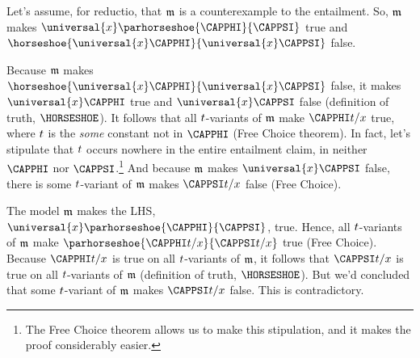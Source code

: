 \begin{PROOF}
	Let's assume, for reductio, that $\mathfrak{m}$ is a counterexample to the entailment.  So, $\mathfrak{m}$ makes $\universal{\variable{x}}\parhorseshoe{\CAPPHI}{\CAPPSI}$ true and $\horseshoe{\universal{\variable{x}}\CAPPHI}{\universal{\variable{x}}\CAPPSI}$ false.
	
	Because $\mathfrak{m}$ makes $\horseshoe{\universal{\variable{x}}\CAPPHI}{\universal{\variable{x}}\CAPPSI}$ false, it makes $\universal{\variable{x}}\CAPPHI$ true and $\universal{\variable{x}}\CAPPSI$ false (definition of truth, $\HORSESHOE$). 
	It follows that all $t$-variants of $\mathfrak{m}$ make $\CAPPHI\variable{t}/\variable{x}$ true, where $t$ is the \emph{some} constant not in $\CAPPHI$ (Free Choice theorem).  In fact, let's stipulate that $t$ occurs nowhere in the entire entailment claim, in neither $\CAPPHI$ nor $\CAPPSI$.\footnote{The Free Choice theorem allows us to make this stipulation, and it makes the proof considerably easier.} 
	 And because $\mathfrak{m}$ makes $\universal{\variable{x}}\CAPPSI$ false, there is some $t$-variant of $\mathfrak{m}$ makes $\CAPPSI\variable{t}/\variable{x}$ false (Free Choice).%

	The model $\mathfrak{m}$ makes the LHS, $\universal{\variable{x}}\parhorseshoe{\CAPPHI}{\CAPPSI}$, true.  
	Hence, all $t$-variants of $\mathfrak{m}$ make $\parhorseshoe{\CAPPHI\variable{t}/\variable{x}}{\CAPPSI\variable{t}/\variable{x}}$ true (Free Choice). %
	 Because $\CAPPHI\variable{t}/\variable{x}$ is true on all $t$-variants of $\mathfrak{m}$, it follows that $\CAPPSI\variable{t}/\variable{x}$ is true on all $t$-variants of $\mathfrak{m}$ (definition of truth, $\HORSESHOE$).  But we'd concluded that some $t$-variant of $\mathfrak{m}$ makes $\CAPPSI\variable{t}/\variable{x}$ false.  This is contradictory.
	 

\end{PROOF}
